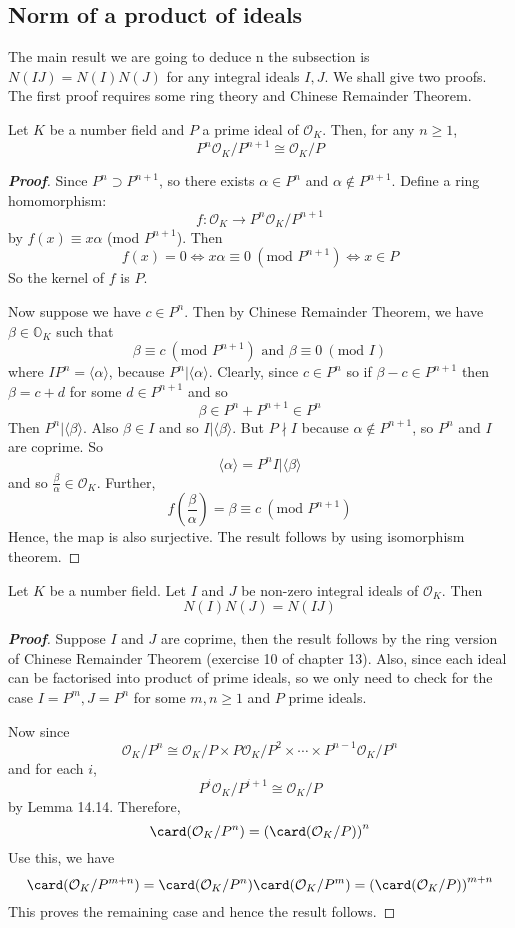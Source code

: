 \subsection{Norm of a product of ideals}
The main result we are going to deduce n the subsection is $N(IJ)=N(I)N(J)$ for any integral ideals $I,J$. We shall give two proofs. The first proof requires some ring theory and Chinese Remainder Theorem.
\begin{lemma} Let $K$ be a number field and $P$ a prime ideal of $\mathcal{O}_K$. Then, for any $n \ge 1$,
$$P^n\mathcal{O}_K/P^{n+1} \cong \mathcal{O}_K/P$$
\end{lemma}
\begin{proof}[\bf Proof] Since $P^n \supset P^{n+1}$, so there exists $\alpha \in P^n$ and $\alpha \not \in P^{n+1}$.
Define a ring homomorphism:
$$f: \mathcal{O}_K \rightarrow P^n\mathcal{O}_K/P^{n+1}$$
by $f(x) \equiv x\alpha$ (mod $P^{n+1}$). Then
$$f(x)=0 \iff x\alpha \equiv 0~(\text{mod } P^{n+1}) \iff x \in P$$
So the kernel of $f$ is $P$.

Now suppose we have $c \in P^n$. Then by Chinese Remainder Theorem, we have $\beta \in \mathbb{O}_K$ such that
$$\beta \equiv c~(\text{mod } P^{n+1}) \text { and } \beta \equiv 0~(\text{mod } I)$$
where $IP^n=\langle \alpha \rangle$, because $P^n \big| \langle \alpha \rangle$.
Clearly, since $c \in P^n$ so if $\beta-c \in P^{n+1}$ then $\beta=c+d$ for some $d \in P^{n+1}$ and so
$$\beta \in P^n+P^{n+1} \in P^n$$ Then $P^n \big| \langle \beta \rangle$.
Also $\beta \in I$ and so $I \big| \langle \beta \rangle$. But $P \nmid I$ because $\alpha \not \in P^{n+1}$, so
$P^n$ and $I$ are coprime. So
$$\langle \alpha \rangle=P^n I \big| \langle \beta \rangle$$
and so $\frac{\beta}{\alpha} \in \mathcal{O}_K$. Further,
$$f\left(\frac{\beta}{\alpha}\right)=\beta \equiv c~(\text{mod } P^{n+1})$$
Hence, the map is also surjective. The result follows by using isomorphism theorem.
\end{proof}
\begin{theorem} Let $K$ be a number field. Let $I$ and $J$ be non-zero integral ideals of $\mathcal{O}_K$. Then
$$N(I)N(J)=N(IJ)$$
\end{theorem}
\begin{proof}[\bf Proof] Suppose $I$ and $J$ are coprime, then the result follows by the ring version of Chinese Remainder Theorem (exercise 10 of chapter 13). Also, since each ideal can be factorised into product of prime ideals, so we only need to check for the case $I=P^m,J=P^n$ for some $m,n \ge 1$ and $P$ prime ideals.

Now since
$$\mathcal{O}_K/P^n \cong \mathcal{O}_K/P \times P\mathcal{O}_K/P^2 \times \cdots \times P^{n-1}\mathcal{O}_K/P^n$$
and for each $i$,
$$P^i \mathcal{O}_K/P^{i+1} \cong \mathcal{O}_K/P$$
by Lemma 14.14. Therefore,
$$\card(\mathcal{O}_K/P^n)=\left(\card(\mathcal{O}_K/P)\right)^n$$
Use this, we have
$$\card(\mathcal{O}_K/P^{m+n})=\card(\mathcal{O}_K/P^n)\card(\mathcal{O}_K/P^m)
=\left(\card(\mathcal{O}_K/P)\right)^{m+n}$$
This proves the remaining case and hence the result follows.
\end{proof}
